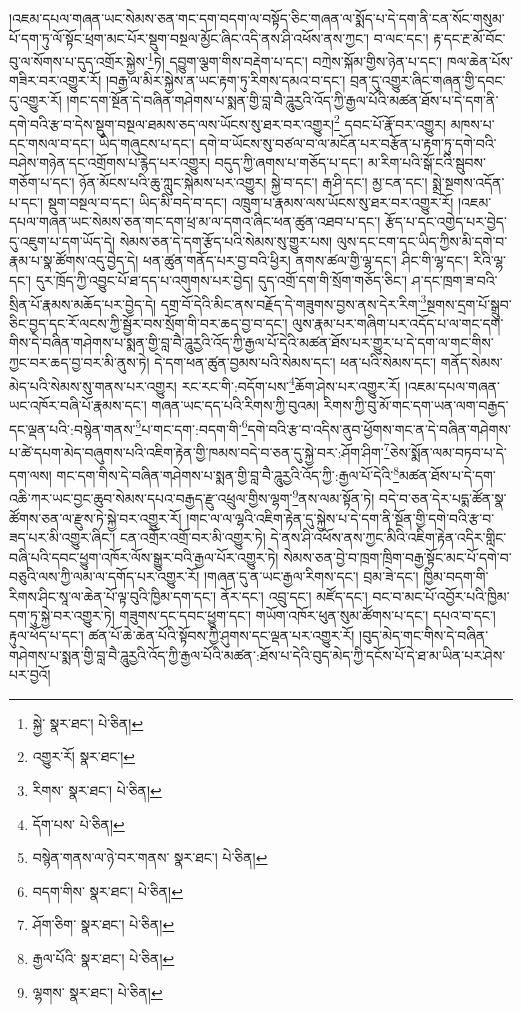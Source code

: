 །འཇམ་དཔལ་གཞན་ཡང་སེམས་ཅན་གང་དག་བདག་ལ་བསྟོད་ཅིང་གཞན་ལ་སྨོད་པ་དེ་དག་ནི་ངན་སོང་གསུམ་པོ་དག་ཏུ་ལོ་སྟོང་ཕྲག་མང་པོར་སྡུག་བསྔལ་མྱོང་ཞིང་འདི་ནས་ཤི་འཕོས་ནས་ཀྱང་། བ་ལང་དང་། རྟ་དང་རྔ་མོ་བོང་བུ་ལ་སོགས་པ་དུད་འགྲོར་སྐྱེས་\footnote{སྐྱེ་  སྣར་ཐང་།  པེ་ཅིན། }ཏེ། དབྱུག་ལྕག་གིས་བརྡེག་པ་དང་། བཀྲེས་སྐོམ་གྱིས་ཉེན་པ་དང་། ཁལ་ཆེན་པོས་གཟིར་བར་འགྱུར་རོ། །བརྒྱ་ལ་མིར་སྐྱེས་ན་ཡང་རྟག་ཏུ་རིགས་དམའ་བ་དང་། བྲན་དུ་འགྱུར་ཞིང་གཞན་གྱི་དབང་དུ་འགྱུར་རོ། །གང་དག་སྔོན་དེ་བཞིན་གཤེགས་པ་སྨན་གྱི་བླ་བཻ་ཌཱུརྱའི་འོད་ཀྱི་རྒྱལ་པོའི་མཚན་ཐོས་པ་དེ་དག་ནི་དགེ་བའི་རྩ་བ་དེས་སྡུག་བསྔལ་ཐམས་ཅད་ལས་ཡོངས་སུ་ཐར་བར་འགྱུར།\footnote{འགྱུར་རོ།  སྣར་ཐང་། } དབང་པོ་རྣོ་བར་འགྱུར། མཁས་པ་དང་གསལ་བ་དང་། ཡིད་གཞུངས་པ་དང་། དགེ་བ་ཡོངས་སུ་བཙལ་བ་ལ་མངོན་པར་བརྩོན་པ་རྟག་ཏུ་དགེ་བའི་བཤེས་གཉེན་དང་འགྲོགས་པ་རྙེད་པར་འགྱུར། བདུད་ཀྱི་ཞགས་པ་གཅོད་པ་དང་། མ་རིག་པའི་སྒོ་ངའི་སྦུབས་གཅོག་པ་དང་། ཉོན་མོངས་པའི་ཆུ་ཀླུང་སྐེམས་པར་འགྱུར། སྐྱེ་བ་དང་། རྒ་ཤི་དང་། མྱ་ངན་དང་། སྨྲེ་སྔགས་འདོན་པ་དང་། སྡུག་བསྔལ་བ་དང་། ཡིད་མི་བདེ་བ་དང་། འཁྲུག་པ་རྣམས་ལས་ཡོངས་སུ་ཐར་བར་འགྱུར་རོ། །འཇམ་དཔལ་གཞན་ཡང་སེམས་ཅན་གང་དག་ཕྲ་མ་ལ་དགའ་ཞིང་ཕན་ཚུན་འཐབ་པ་དང་། རྩོད་པ་དང་འགྱེད་པར་བྱེད་དུ་འཇུག་པ་དག་ཡོད་དེ། སེམས་ཅན་དེ་དག་རྩོད་པའི་སེམས་སུ་གྱུར་པས། ལུས་དང་ངག་དང་ཡིད་ཀྱིས་མི་དགེ་བ་རྣམ་པ་སྣ་ཚོགས་འདུ་བྱེད་དེ། ཕན་ཚུན་གནོད་པར་བྱ་བའི་ཕྱིར། ནགས་ཚལ་གྱི་ལྷ་དང་། ཤིང་གི་ལྷ་དང་། རིའི་ལྷ་དང་། དུར་ཁྲོད་ཀྱི་འབྱུང་པོ་ཐ་དད་པ་འགུགས་པར་བྱེད། དུད་འགྲོ་དག་གི་སྲོག་གཅོད་ཅིང་། ཤ་དང་ཁྲག་ཟ་བའི་སྲིན་པོ་རྣམས་མཆོད་པར་བྱེད་དེ། དགྲ་བོ་དེའི་མིང་ནས་བརྗོད་དེ་གཟུགས་བྱས་ནས་དེར་རིག་\footnote{རིགས་  སྣར་ཐང་།  པེ་ཅིན། }སྔགས་དྲག་པོ་སྒྲུབ་ཅིང་བྱད་དང་རོ་ལངས་ཀྱི་སྦྱོར་བས་སྲོག་གི་བར་ཆད་བྱ་བ་དང་། ལུས་རྣམ་པར་གཞིག་པར་འདོད་པ་ལ་གང་དག་གིས་དེ་བཞིན་གཤེགས་པ་སྨན་གྱི་བླ་བཻ་ཌཱུརྱའི་འོད་ཀྱི་རྒྱལ་པོ་དེའི་མཚན་ཐོས་པར་གྱུར་པ་དེ་དག་ལ་གང་གིས་ཀྱང་བར་ཆད་བྱ་བར་མི་ནུས་ཏེ། དེ་དག་ཕན་ཚུན་བྱམས་པའི་སེམས་དང་། ཕན་པའི་སེམས་དང་། གནོད་སེམས་མེད་པའི་སེམས་སུ་གནས་པར་འགྱུར། རང་རང་གི་:བདོག་པས་\footnote{དོག་པས་  པེ་ཅིན། }ཆོག་ཤེས་པར་འགྱུར་རོ། །འཇམ་དཔལ་གཞན་ཡང་འཁོར་བཞི་པོ་རྣམས་དང་། གཞན་ཡང་དད་པའི་རིགས་ཀྱི་བུའམ། རིགས་ཀྱི་བུ་མོ་གང་དག་ཡན་ལག་བརྒྱད་དང་ལྡན་པའི་:བསྙེན་གནས་\footnote{བསྙེན་གནས་ལ་ཉེ་བར་གནས་  སྣར་ཐང་།  པེ་ཅིན། }པ་གང་དག་:བདག་གི་\footnote{བདག་གིས་  སྣར་ཐང་།  པེ་ཅིན། }དགེ་བའི་རྩ་བ་འདིས་ནུབ་ཕྱོགས་གང་ན་དེ་བཞིན་གཤེགས་པ་ཚེ་དཔག་མེད་བཞུགས་པའི་འཇིག་རྟེན་གྱི་ཁམས་བདེ་བ་ཅན་དུ་སྐྱེ་བར་:ཤོག་ཤིག་\footnote{ཤོག་ཅིག་  སྣར་ཐང་།  པེ་ཅིན། }ཅེས་སྨོན་ལམ་བཏབ་པ་དེ་དག་ལས། གང་དག་གིས་དེ་བཞིན་གཤེགས་པ་སྨན་གྱི་བླ་བཻ་ཌཱུརྱའི་འོད་ཀྱི་:རྒྱལ་པོ་དེའི་\footnote{རྒྱལ་པོའི་  སྣར་ཐང་།  པེ་ཅིན། }མཚན་ཐོས་པ་དེ་དག་འཆི་ཀར་ཡང་བྱང་ཆུབ་སེམས་དཔའ་བརྒྱད་རྫུ་འཕྲུལ་གྱིས་ལྷག་\footnote{ལྷགས་  སྣར་ཐང་།  པེ་ཅིན། }ནས་ལམ་སྟོན་ཏེ། བདེ་བ་ཅན་དེར་པདྨ་ཚོན་སྣ་ཚོགས་ཅན་ལ་རྫུས་ཏེ་སྐྱེ་བར་འགྱུར་རོ། །གང་ལ་ལ་ལྷའི་འཇིག་རྟེན་དུ་སྐྱེས་པ་དེ་དག་ནི་སྔོན་གྱི་དགེ་བའི་རྩ་བ་ཟད་པར་མི་འགྱུར་ཞིང་། ངན་འགྲོར་འགྲོ་བར་མི་འགྱུར་ཏེ། དེ་ནས་ཤི་འཕོས་ནས་ཀྱང་མིའི་འཇིག་རྟེན་འདིར་གླིང་བཞི་པའི་དབང་ཕྱུག་འཁོར་ལོས་སྒྱུར་བའི་རྒྱལ་པོར་འགྱུར་ཏེ། སེམས་ཅན་བྱེ་བ་ཁྲག་ཁྲིག་བརྒྱ་སྟོང་མང་པོ་དགེ་བ་བཅུའི་ལས་ཀྱི་ལམ་ལ་དགོད་པར་འགྱུར་རོ། །གཞན་དུ་ན་ཡང་རྒྱལ་རིགས་དང་། བྲམ་ཟེ་དང་། ཁྱིམ་བདག་གི་རིགས་ཤིང་སཱ་ལ་ཆེན་པོ་ལྟ་བུའི་ཁྱིམ་དག་དང་། ནོར་དང་། འབྲུ་དང་། མཛོད་དང་། བང་བ་མང་པོ་འབྱོར་པའི་ཁྱིམ་དག་ཏུ་སྐྱེ་བར་འགྱུར་ཏེ། གཟུགས་དང་དབང་ཕྱུག་དང་། གཡོག་འཁོར་ཕུན་སུམ་ཚོགས་པ་དང་། དཔའ་བ་དང་། རྟུལ་ཕོད་པ་དང་། ཚན་པོ་ཆེ་ཆེན་པོའི་སྟོབས་ཀྱི་ཤུགས་དང་ལྡན་པར་འགྱུར་རོ། །བུད་མེད་གང་གིས་དེ་བཞིན་གཤེགས་པ་སྨན་གྱི་བླ་བཻ་ཌཱུརྱའི་འོད་ཀྱི་རྒྱལ་པོའི་མཚན་:ཐོས་པ་དེའི་བུད་མེད་ཀྱི་དངོས་པོ་དེ་ཐ་མ་ཡིན་པར་ཤེས་པར་བྱའོ། 